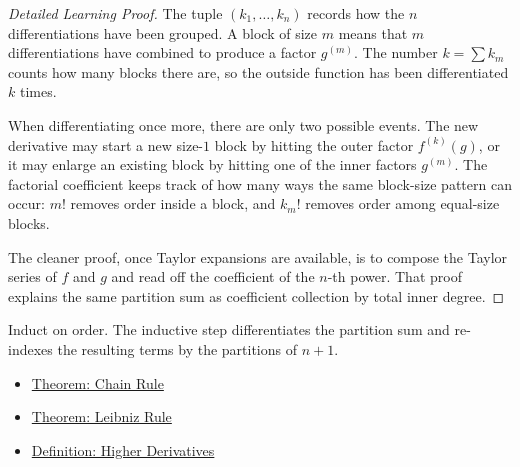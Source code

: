 \begin{proof}[Detailed Learning Proof]
\LRAProofBodyStart
The tuple \((k_1,\ldots,k_n)\) records how the \(n\) differentiations have
been grouped. A block of size \(m\) means that \(m\) differentiations have
combined to produce a factor \(g^{(m)}\). The number \(k=\sum k_m\) counts
how many blocks there are, so the outside function has been differentiated
\(k\) times.

When differentiating once more, there are only two possible events. The new
derivative may start a new size-\(1\) block by hitting the outer factor
\(f^{(k)}(g)\), or it may enlarge an existing block by hitting one of the
inner factors \(g^{(m)}\). The factorial coefficient keeps track of how many
ways the same block-size pattern can occur: \(m!\) removes order inside a
block, and \(k_m!\) removes order among equal-size blocks.

The cleaner proof, once Taylor expansions are available, is to compose the
Taylor series of \(f\) and \(g\) and read off the coefficient of the
\(n\)-th power. That proof explains the same partition sum as coefficient
collection by total inner degree.
\end{proof}

\begin{remark*}
Induct on order. The inductive step differentiates the partition sum and
re-indexes the resulting terms by the partitions of \(n+1\).
\end{remark*}

\begin{dependencies}
\begin{itemize}
  \item \hyperref[thm:chain-rule]{Theorem: Chain Rule}
  \item \hyperref[thm:leibniz-rule]{Theorem: Leibniz Rule}
  \item \hyperref[def:higher-derivatives]{Definition: Higher Derivatives}
\end{itemize}
\end{dependencies}

\clearpage
